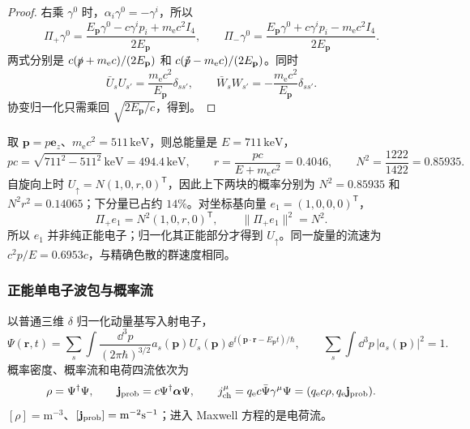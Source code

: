\begin{proof}
右乘 $\gamma^0$ 时，$\alpha_i\gamma^0=-\gamma^i$，所以
\begin{equation*}
 \Pi_+\gamma^0=\frac{E_{\mathbf p}\gamma^0-c\gamma^ip_i+m_{\mathrm e}c^2I_4}{2E_{\mathbf p}},
 \qquad
 \Pi_-\gamma^0=\frac{E_{\mathbf p}\gamma^0+c\gamma^ip_i-m_{\mathrm e}c^2I_4}{2E_{\mathbf p}}.
\end{equation*}
两式分别是 $c(\slashed p+m_{\mathrm e}c)/(2E_{\mathbf p})$ 和 $c(\slashed{\tilde p}-m_{\mathrm e}c)/(2E_{\mathbf p})$。同时
\begin{equation*}
 \bar U_sU_{s'}=\frac{m_{\mathrm e}c^2}{E_{\mathbf p}}\delta_{ss'},
 \qquad
 \bar W_sW_{s'}=-\frac{m_{\mathrm e}c^2}{E_{\mathbf p}}\delta_{ss'}.
\end{equation*}
协变归一化只需乘回 $\sqrt{2E_{\mathbf p}/c}$，得到。
\end{proof}

\begin{exbox}
取 $\mathbf p=p\mathbf e_z$、$m_{\mathrm e}c^2=511\,\mathrm{keV}$，则总能量是 $E=711\,\mathrm{keV}$，
\begin{equation*}
 pc=\sqrt{711^2-511^2}\,\mathrm{keV}=494.4\,\mathrm{keV},
 \qquad r=\frac{pc}{E+m_{\mathrm e}c^2}=0.4046,
 \qquad N^2=\frac{1222}{1422}=0.85935.
\end{equation*}
自旋向上时 $U_\uparrow=N(1,0,r,0)^{\mathsf T}$，因此上下两块的概率分别为 $N^2=0.85935$ 和 $N^2r^2=0.14065$；下分量已占约 $14\%$。对坐标基向量 $e_1=(1,0,0,0)^{\mathsf T}$，
\begin{equation*}
 \Pi_+e_1=N^2(1,0,r,0)^{\mathsf T},
 \qquad \|\Pi_+e_1\|^2=N^2.
\end{equation*}
所以 $e_1$ 并非纯正能电子；归一化其正能部分才得到 $U_\uparrow$。同一旋量的流速为 $c^2p/E=0.6953c$，与精确色散的群速度相同。
\end{exbox}

\subsubsection{正能单电子波包与概率流}
\label{sec:feqo-current-and-packet}
\begin{definition}[正能单电子波包与概率流]
以普通三维 $\delta$ 归一化动量基写入射电子，
\begin{equation}
 \Psi(\mathbf r,t)=\sum_s\int\frac{\dd^3p}{(2\pi\hbar)^{3/2}}
 a_s(\mathbf p)U_s(\mathbf p)
 \ee^{\ii(\mathbf p\cdot\mathbf r-E_{\mathbf p}t)/\hbar},
 \qquad \sum_s\int\dd^3p\,|a_s(\mathbf p)|^2=1.
 \label{eq:feqo-positive-wavepacket}
\end{equation}
概率密度、概率流和电荷四流依次为
\begin{equation}
 \rho=\Psi^\dagger\Psi,\qquad
 \mathbf j_{\rm prob}=c\Psi^\dagger\boldsymbol\alpha\Psi,\qquad
 j_{\rm ch}^\mu=q_{\mathrm e}c\bar\Psi\gamma^\mu\Psi
 =(q_{\mathrm e}c\rho,q_{\mathrm e}\mathbf j_{\rm prob}).
 \label{eq:feqo-dirac-current}
\end{equation}
$[\rho]=\mathrm{m^{-3}}$、$[\mathbf j_{\rm prob}]=\mathrm{m^{-2}s^{-1}}$；进入 Maxwell 方程的是电荷流。
\end{definition}

